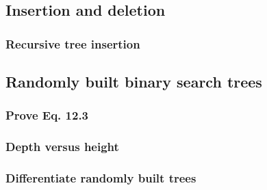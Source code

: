 \documentclass{article}
\begin{document}

\subsection{Insertion and deletion}

\subsubsection{Recursive tree insertion}

\begin{comment}
\subsubsection{Cost of repeated insertion and searching}
\subsubsection{Cost of sorting with binary search tree}
\subsubsection{Is deletion commutative?}
\subsubsection{Implement search, insert, delete with successor}
\subsubsection{Choose predecessor for delete}
\end{comment}


\subsection{Randomly built binary search trees}

\subsubsection{Prove Eq. 12.3}

\subsubsection{Depth versus height}

\subsubsection{Differentiate randomly built trees}
\end{document}
